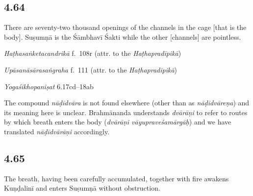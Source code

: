 \begin{ekdosis}
\subsection*{4.64}
\begin{translation}[hp04_064]
There are seventy-two thousand openings  of the channels in the cage [that is the body]. Suṣumṇā is the Śāmbhavī Śakti while the other [channels] are pointless.
\end{translation}%


\begin{testimonia}[hp04_064]
\emph{Haṭhasaṅketacandrikā} f.~108r (attr. to the \emph{Haṭhapradīpikā})
\begin{versinnote}
\end{versinnote}

\emph{Upāsanāsārasaṅgraha} f.~111 (attr. to the \emph{Haṭhapradīpikā})
\begin{versinnote}
\end{versinnote}

\emph{Yogaśikhopaniṣat} 6.17cd–18ab
\begin{versinnote}
\end{versinnote}
\end{testimonia}

\begin{philcomm}[hp04_064]
The compound \emph{nāḍīdvāra} is not found elsewhere (other than as \emph{nāḍīdvāreṇa}) and its meaning here is unclear. Brahmānanda understands \emph{dvārāṇi} to refer to routes by which breath enters the body (\emph{dvārāṇi vāyupraveśamārgāḥ}) and we have translated \emph{nāḍīdvārāṇi} accordingly.
\end{philcomm}

\subsection*{4.65}
\begin{translation}[hp04_065]
The breath, having been carefully accumulated, together with fire awakens Kuṇḍalinī and enters Suṣumṇā without obstruction.


\end{translation}
\end{ekdosis}
